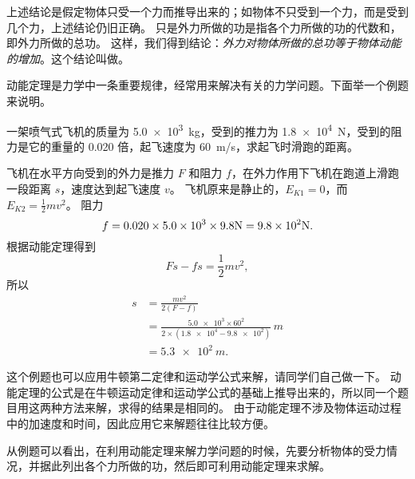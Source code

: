 上述结论是假定物体只受一个力而推导出来的；如物体不只受到一个力，而是受到几个力，上述结论仍旧正确。
只是外力所做的功是指各个力所做的功的代数和，即外力所做的总功。
这样，我们得到结论：\emph{外力对物体所做的总功等于物体动能的增加}。这个结论叫做。

动能定理是力学中一条重要规律，经常用来解决有关的力学问题。下面举一个例题来说明。

\begin{example}
  一架喷气式飞机的质量为 \qty{5.0e3}{kg}，受到的推力为 \qty{1.8e4}{N}，受到的阻力是它的重量的 0.020 倍，起飞速度为 \qty{60}{m/s}，求起飞时滑跑的距离。
\end{example}

\begin{solution}
  飞机在水平方向受到的外力是推力 $F$ 和阻力 $f$，在外力作用下飞机在跑道上滑跑一段距离 $s$，速度达到起飞速度 $v$。
  飞机原来是静止的，$E_{K1}=0$，而 $E_{K2}=\frac{1}{2}mv^2$。
  阻力
  \[ f=0.020\times 5.0\times 10^{3}\times 9.8{\rm N}=9.8\times 10^2{\rm N}. \]
  根据动能定理得到
	\[Fs-fs=\frac{1}{2}mv^2, \]
    所以
    \[\begin{split}
        s&=\frac{mv^2}{2(F-f)}\\
&=\frac{\num{5.0e3}\times 60^2}{2\times (\num{1.8e4}-\num{9.8e2})}\,\unit{m}\\
&=\qty{5.3e2}{m}.
    \end{split}\]
	\end{solution}

这个例题也可以应用牛顿第二定律和运动学公式来解，请同学们自己做一下。
动能定理的公式是在牛顿运动定律和运动学公式的基础上推导出来的，所以同一个题目用这两种方法来解，求得的结果是相同的。
由于动能定理不涉及物体运动过程中的加速度和时间，因此应用它来解题往往比较方便。

从例题可以看出，在利用动能定理来解力学问题的时候，先要分析物体的受力情况，并据此列出各个力所做的功，然后即可利用动能定理来求解。
    

